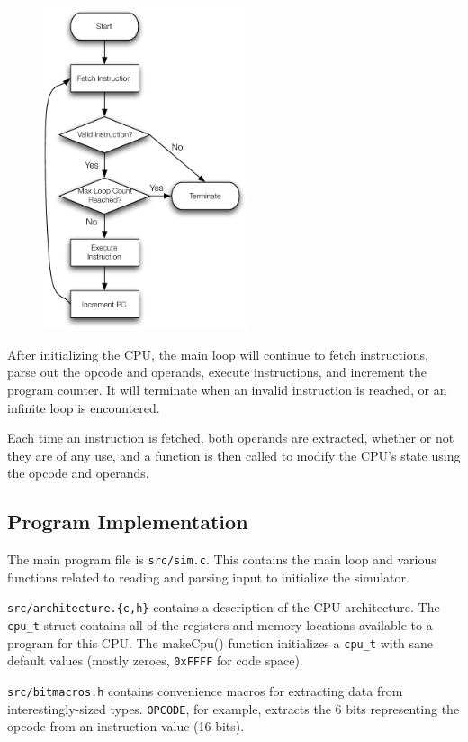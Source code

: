 \documentclass[11pt,letterpaper]{article}
\begin{document}
\begin{figure}
  \begin{center}
   \includegraphics[width=60mm]{flow.pdf}
  \end{center}
\end{figure}

After initializing the CPU, the main loop will continue to fetch instructions, parse out the opcode and operands, execute instructions, and increment the program counter. It will terminate when an invalid instruction is reached, or an infinite loop is encountered.

Each time an instruction is fetched, both operands are extracted, whether or not they are of any use, and a function is then called to modify the CPU's state using the opcode and operands.

\subsection{Program Implementation}

The main program file is \texttt{src/sim.c}. This contains the main loop and various functions related to reading and parsing input to initialize the simulator.

\texttt{src/architecture.\{c,h\}} contains a description of the CPU architecture. The \texttt{cpu\_t} struct contains all of the registers and memory locations available to a program for this CPU. The makeCpu() function initializes a \texttt{cpu\_t} with sane default values (mostly zeroes, \texttt{0xFFFF} for code space).

\texttt{src/bitmacros.h} contains convenience macros for extracting data from interestingly-sized types. \texttt{OPCODE}, for example, extracts the 6 bits representing the opcode from an instruction value (16 bits).
\end{document}
